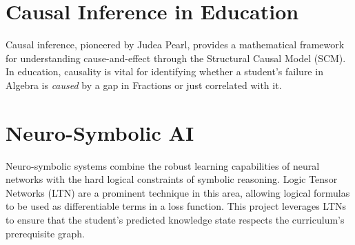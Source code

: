\section{Causal Inference in Education}
Causal inference, pioneered by Judea Pearl, provides a mathematical framework for understanding cause-and-effect through the Structural Causal Model (SCM). In education, causality is vital for identifying whether a student's failure in Algebra is \textit{caused} by a gap in Fractions or just correlated with it.

\section{Neuro-Symbolic AI}
Neuro-symbolic systems combine the robust learning capabilities of neural networks with the hard logical constraints of symbolic reasoning. Logic Tensor Networks (LTN) are a prominent technique in this area, allowing logical formulas to be used as differentiable terms in a loss function. This project leverages LTNs to ensure that the student's predicted knowledge state respects the curriculum's prerequisite graph.

